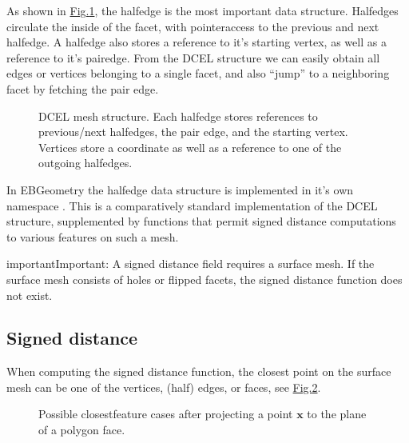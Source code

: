 \documentclass[letterpaper,10pt,english]{sphinxmanual}
\let\sphinxpxdimen\pdfpxdimen\else\newdimen\sphinxpxdimen
\begin{document}
\sphinxAtStartPar
As shown in \hyperref[\detokenize{DCEL:fig-dcel}]{Fig.\@ \ref{\detokenize{DCEL:fig-dcel}}}, the half\sphinxhyphen{}edge is the most important data structure.
Half\sphinxhyphen{}edges circulate the inside of the facet, with pointer\sphinxhyphen{}access to the previous and next half\sphinxhyphen{}edge.
A half\sphinxhyphen{}edge also stores a reference to it’s starting vertex, as well as a reference to it’s pair\sphinxhyphen{}edge.
From the DCEL structure we can easily obtain all edges or vertices belonging to a single facet, and also “jump” to a neighboring facet by fetching the pair edge.

\begin{figure}[htbp]
\centering
\capstart

\noindent\sphinxincludegraphics[width=480\sphinxpxdimen]{{DCEL}.png}
\caption{DCEL mesh structure. Each half\sphinxhyphen{}edge stores references to previous/next half\sphinxhyphen{}edges, the pair edge, and the starting vertex.
Vertices store a coordinate as well as a reference to one of the outgoing half\sphinxhyphen{}edges.}\label{\detokenize{DCEL:id2}}\label{\detokenize{DCEL:fig-dcel}}\end{figure}

\sphinxAtStartPar
In EBGeometry the half\sphinxhyphen{}edge data structure is implemented in it’s own namespace .
This is a comparatively standard implementation of the DCEL structure, supplemented by functions that permit signed distance computations to various features on such a mesh.

\begin{sphinxadmonition}{important}{Important:}
\sphinxAtStartPar
A signed distance field requires a  surface mesh.
If the surface mesh consists of holes or flipped facets, the signed distance function does not exist.
\end{sphinxadmonition}


\subsection{Signed distance}
\label{\detokenize{DCEL:signed-distance}}
\sphinxAtStartPar
When computing the signed distance function, the closest point on the surface mesh can be one of the vertices, (half\sphinxhyphen{}) edges, or faces, see \hyperref[\detokenize{DCEL:fig-polygonprojection}]{Fig.\@ \ref{\detokenize{DCEL:fig-polygonprojection}}}.

\begin{figure}[htbp]
\centering
\capstart

\noindent\sphinxincludegraphics[width=240\sphinxpxdimen]{{PolygonProjection}.png}
\caption{Possible closest\sphinxhyphen{}feature cases after projecting a point \(\mathbf{x}\) to the plane of a polygon face.}\label{\detokenize{DCEL:id3}}\label{\detokenize{DCEL:fig-polygonprojection}}\end{figure}
\end{document}
